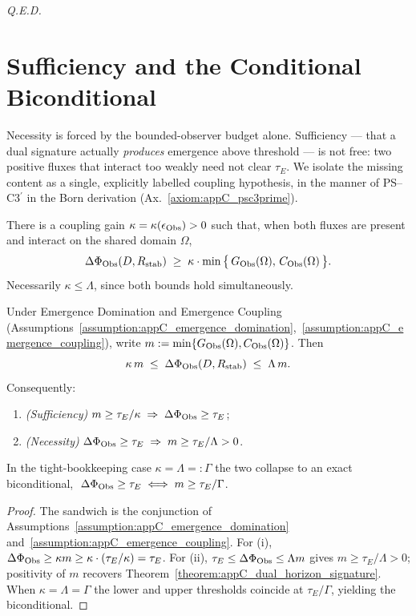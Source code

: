 \begin{flushright}
\textit{Q.E.D.}
\end{flushright}

\section{Sufficiency and the Conditional Biconditional} \label{subsec:appC_conclusion_of_proof_by_elimination}
Necessity is forced by the bounded-observer budget alone. Sufficiency --- that a dual
signature actually \emph{produces} emergence above threshold --- is not free: two
positive fluxes that interact too weakly need not clear \(\tau_E\). We isolate the
missing content as a single, explicitly labelled coupling hypothesis, in the manner
of PS--C3\(^\prime\) in the Born derivation (Ax.~\ref{axiom:appC_psc3prime}).

\begin{assumption}
\label{assumption:appC_emergence_coupling}
There is a coupling gain \(\kappa=\kappa(\epsilon_{\mathrm{Obs}})>0\) such that, when both
fluxes are present and interact on the shared domain \(\Omega\),
\[
\Delta\Phi_{\mathrm{Obs}}(D, R_{\mathrm{stab}})
\;\ge\; \kappa\cdot\min\big\{\,G_{\mathrm{Obs}}(\Omega),\, C_{\mathrm{Obs}}(\Omega)\,\big\}.
\]
Necessarily \(\kappa\le\Lambda\), since both bounds hold simultaneously.
\end{assumption}

\begin{theorem}
\label{theorem:appC_dual_horizon_biconditional}
Under Emergence Domination and Emergence Coupling
(Assumptions~\ref{assumption:appC_emergence_domination},~\ref{assumption:appC_emergence_coupling}),
write \(m:=\min\{G_{\mathrm{Obs}}(\Omega),C_{\mathrm{Obs}}(\Omega)\}\). Then
\[
\kappa\, m \;\le\; \Delta\Phi_{\mathrm{Obs}}(D,R_{\mathrm{stab}}) \;\le\; \Lambda\, m .
\]
Consequently:
\begin{enumerate}[label=(\roman*)]
\item \emph{(Sufficiency)} \(m \ge \tau_E/\kappa \;\Rightarrow\; \Delta\Phi_{\mathrm{Obs}}\ge\tau_E\);
\item \emph{(Necessity)} \(\Delta\Phi_{\mathrm{Obs}}\ge\tau_E \;\Rightarrow\; m \ge \tau_E/\Lambda > 0\).
\end{enumerate}
In the tight-bookkeeping case \(\kappa=\Lambda=:\Gamma\) the two collapse to an exact
biconditional, \(\;\Delta\Phi_{\mathrm{Obs}}\ge\tau_E \iff m\ge\tau_E/\Gamma\).
\end{theorem}
\begin{proof}
\label{proof:appC_dual_horizon_biconditional}
The sandwich is the conjunction of
Assumptions~\ref{assumption:appC_emergence_domination}
and~\ref{assumption:appC_emergence_coupling}. For (i),
\(\Delta\Phi_{\mathrm{Obs}}\ge\kappa m\ge\kappa\cdot(\tau_E/\kappa)=\tau_E\). For (ii),
\(\tau_E\le\Delta\Phi_{\mathrm{Obs}}\le\Lambda m\) gives \(m\ge\tau_E/\Lambda>0\); positivity
of \(m\) recovers Theorem~\ref{theorem:appC_dual_horizon_signature}. When
\(\kappa=\Lambda=\Gamma\) the lower and upper thresholds coincide at
\(\tau_E/\Gamma\), yielding the biconditional.
\end{proof}

